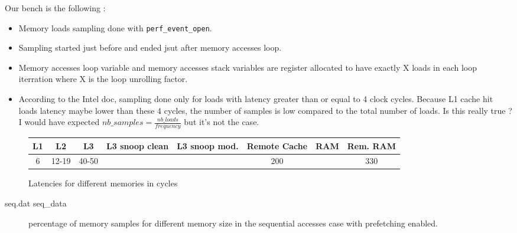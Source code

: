 \documentclass[10pt,a4paper]{article}
\begin{document}
Our bench is the following :
\begin{itemize}
\item Memory loads sampling done with \texttt{perf\_event\_open}.
\item  Sampling  started  just  before and  ended  jsut  after  memory
  accesses loop.
\item  Memory  accesses  loop   variable  and  memory  accesses  stack
  variables are  register allocated  to have exactly  X loads  in each
  loop iterration where X is the loop unrolling factor.
\item According  to the Intel doc,  sampling done only for  loads with
  latency greater  than or equal to  4 clock cycles. Because  L1 cache
  hit loads  latency maybe lower  than these  4 cycles, the  number of
  samples is low compared to the total number of loads. Is this really
  true    ?      I    would     have    expected     $nb\_samples    =
  \frac{nb\_loads}{frequency}$ but it's not the case.
\end{itemize}

\begin{figure}[h]
  \begin{tabular}{|c|c|c|c|c|c|c|c|}
    \hline
    L1 & L2    & L3    & L3 snoop clean & L3 snoop mod. & Remote Cache & RAM & Rem. RAM \\
    \hline
    6  & 12-19 & 40-50 &                &               & 200          &     & 330      \\
    \hline
  \end{tabular}
  \caption{Latencies for different memories in cycles}
\end{figure}

\begin{filecontents}{seq.dat}
seq_data
\end{filecontents}

\begin{figure}[h]
  \caption{percentage of memory samples for different memory size in the sequential
    accesses case with prefetching enabled.}
\end{figure}
\end{document}
